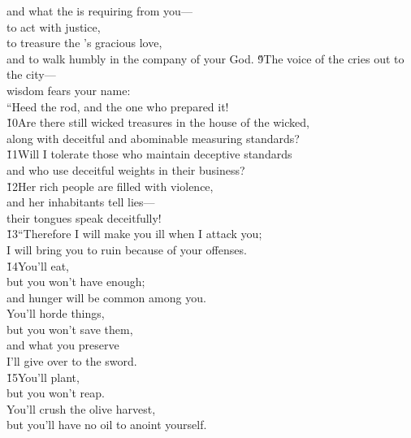 \begin{poetry}
\poemll    and what the  is requiring from you--- \\
\poeml to act with justice, \\
\poemll    to treasure the 's gracious love, \\
\poemlll       and to walk humbly in the company of your God.
\poeml \v{9}The voice of the  cries out to the city--- \\
\poemll    wisdom fears your name: \\
\poemlll       ``Heed the rod, and the one who prepared it! \\
\poeml \v{10}Are there still wicked treasures in the house of the wicked, \\
\poemll    along with deceitful and abominable measuring standards? \\
\poeml \v{11}Will I tolerate those who maintain deceptive standards \\
\poemll    and who use deceitful weights in their business? \\
\poeml \v{12}Her rich people are filled with violence, \\
\poemll    and her inhabitants tell lies--- \\
\poemlll       their tongues speak deceitfully! \\
\poeml \v{13}``Therefore I will make you ill when I attack you; \\
\poemll    I will bring you to ruin because of your offenses. \\
\poeml \v{14}You'll eat, \\
\poemll    but you won't have enough; \\
\poemlll       and hunger will be common among you. \\
\poeml You'll horde things, \\
\poemll    but you won't save them, \\
\poeml and what you preserve \\
\poemll    I'll give over to the sword. \\
\poeml \v{15}You'll plant, \\
\poemll    but you won't reap. \\
\poeml You'll crush the olive harvest, \\
\poemll    but you'll have no oil to anoint yourself. \\

\end{poetry}
